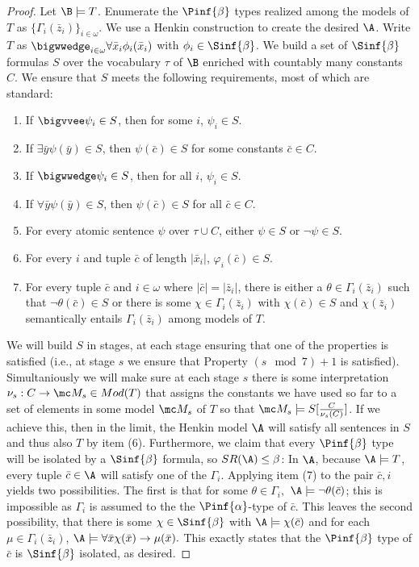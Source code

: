 \documentclass{amsart}
\renewcommand{\-}{\text{-}}
\begin{document}
\havingPimodels

\begin{proof}
Let $\B\models T$.
Enumerate the $\Pinf{\beta}$ types realized among the models of $T$ as $\{\Gamma_i(\bar{z}_i)\}_{i\in\omega}$.
We use a Henkin construction to create the desired $\A$.
Write $T$ as $\bigwwedge_{i\in\omega} \forall \bar{x}_i \phi_i(\bar{x}_i)$ with $\phi_i\in \Sinf{\beta}$.
We build a set of $\Sinf{\beta}$ formulas $S$ over the vocabulary $\tau$ of $\B$ enriched with countably many constants $C$.
We ensure that $S$ meets the following requirements, most of which are standard:
		\begin{enumerate}
			\item If $\bigvvee \psi_i \in S$, then for some $i$, $\psi_i \in S$.
			\item If $\exists \bar y \psi(\bar y) \in S$, then $\psi(\bar c) \in S$ for some constants $\bar c \in C$.
			\item If $\bigwwedge \psi_i \in S$, then for all $i$, $\psi_i \in S$.
			\item If $\forall \bar y \psi(\bar y) \in S$, then $\psi(\bar c) \in S$ for all $\bar c \in C$.
			\item For every atomic sentence $\psi$ over $\tau \cup C$, either $\psi \in S$ or $\neg \psi \in S$.
			\item For every $i$ and tuple $\bar{c}$ of length $\vert \bar{x}_i \vert$, $\varphi_i(\bar{c})\in S$.
			\item For every tuple $\bar{c}$ and $i\in\omega$ where $|\bar{c}|=|\bar{z}_i|$, there is either a $\theta\in \Gamma_i(\bar{z}_i)$ such that $\lnot\theta(\bar{c})\in S$ or there is some $\chi\in\Gamma_i(\bar{z}_i)$ with $\chi(\bar{c})\in S$ and $\chi(\bar{z}_i)$ semantically entails $\Gamma_i(\bar{z}_i)$ among models of $T$.
		\end{enumerate}
    We will build $S$ in stages, at each stage ensuring that one of the properties is satisfied (i.e., at stage $s$ we ensure that Property $(s\mod 7)+1$ is satisfied). Simultaniously we will make sure at each stage $s$ there is some interpretation $\nu_s:C\to \mc M_s \in Mod(T)$ that assigns the constants we have used so far to a set of elements in some model $\mc M_s$ of $T$ so that $\mc M_s\models S[\frac{C}{\nu_s(C)}]$.
		If we achieve this, then in the limit, the Henkin model $\A$ will satisfy all sentences in $S$ and thus also $T$ by item (6).
		Furthermore, we claim that every $\Pinf{\beta}$ type will be isolated by a $\Sinf{\beta}$ formula, so $SR(\A)\leq \beta$:
		In $\A$, because $\A\models T$, every tuple $\bar c\in \A$ will satisfy one of the $\Gamma_i$.
		Applying item (7) to the pair $\bar c,i$ yields two possibilities.
		The first is that for some $\theta\in\Gamma_i,$ $\A\models\lnot \theta(\bar{c})$; this is impossible as $\Gamma_i$ is assumed to the the $\Pinf{\alpha}$-type of $\bar{c}$.
		This leaves the second possibility, that there is some $\chi\in\Sinf{\beta}$ with $\A\models\chi(\bar{c})$ and for each $\mu\in\Gamma_i(\bar{z}_i)$, $\A\models\forall \bar x\chi(\bar x)\to \mu(\bar x).$
		This exactly states that the $\Pinf{\beta}$ type of $\bar{c}$ is $\Sinf{\beta}$ isolated, as desired.
		

\end{proof}
\end{document}
